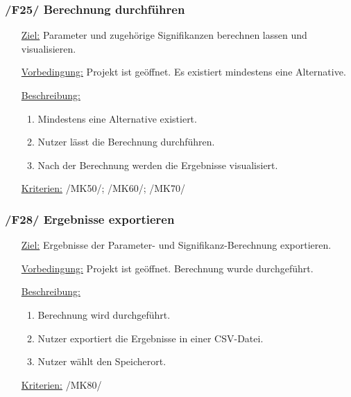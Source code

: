 \documentclass{article}
\begin{document}
\subsubsection*{/F25/ Berechnung durchführen}
\begin{itemize}
    \item[\underline{Ziel:}] Parameter und zugehörige Signifikanzen berechnen lassen und visualisieren.
    \item[\underline{Vorbedingung:}] Projekt ist geöffnet. Es existiert mindestens eine Alternative.
    \item[\underline{Beschreibung:}]
    \begin{enumerate}
        \item Mindestens eine Alternative existiert.
        \item Nutzer lässt die Berechnung durchführen.
        \item Nach der Berechnung werden die Ergebnisse visualisiert.
    \end{enumerate}
    \item[\underline{Kriterien:}] /MK50/; /MK60/; /MK70/ 
\end{itemize} 

\subsubsection*{/F28/ Ergebnisse exportieren}
\begin{itemize}
    \item[\underline{Ziel:}] Ergebnisse der Parameter- und Signifikanz-Berechnung exportieren.
    \item[\underline{Vorbedingung:}] Projekt ist geöffnet. Berechnung wurde durchgeführt.
    \item[\underline{Beschreibung:}]
    \begin{enumerate}
        \item Berechnung wird durchgeführt.
        \item Nutzer exportiert die Ergebnisse in einer CSV-Datei.
        \item Nutzer wählt den Speicherort.
    \end{enumerate}
    \item[\underline{Kriterien:}] /MK80/
\end{itemize}
\end{document}
